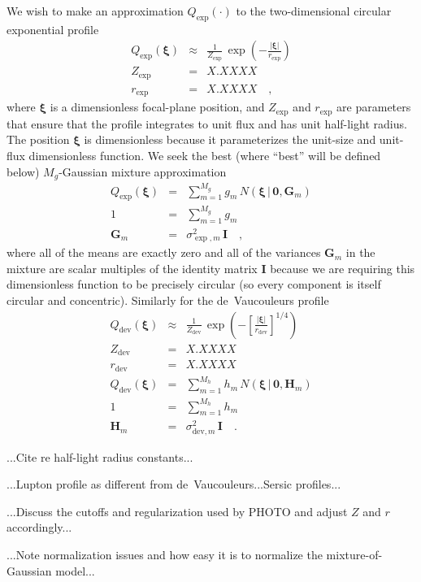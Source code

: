 \documentclass[12pt,pdftex,preprint]{aastex}
\newcommand{\tmatrix}[1]{\boldsymbol{#1}}
\newcommand{\tvector}[1]{\boldsymbol{#1}}
\newcommand{\spos}{\tvector{\xi}}
\newcommand{\Gm}{\tmatrix{G}}
\newcommand{\Hm}{\tmatrix{H}}
\newcommand{\zero}{\tmatrix{0}}
\newcommand{\identity}{\tmatrix{I}}
\newcommand{\normal}{N}
\newcommand{\given}{\,|\,}
\newcommand{\dev}{\mathrm{dev}}
\begin{document}
We wish to make an approximation $Q_{\exp}(\cdot)$ to the
two-dimensional circular exponential profile
\begin{eqnarray}\displaystyle
Q_{\exp}(\spos) &\approx& \frac{1}{Z_{\exp}}\,\exp(-\frac{|\spos|}{r_{\exp}})
\\
Z_{\exp} &=& X.XXXX
\\
r_{\exp} &=& X.XXXX
\quad ,
\end{eqnarray}
where $\spos$ is a dimensionless focal-plane position, and $Z_{\exp}$
and $r_{\exp}$ are parameters that ensure that the profile integrates
to unit flux and has unit half-light radius.  The position $\spos$ is
dimensionless because it parameterizes the unit-size and unit-flux
dimensionless function.  We seek the best (where ``best'' will be
defined below) $M_g$-Gaussian mixture approximation
\begin{eqnarray}\displaystyle
Q_{\exp}(\spos) &=& \sum_{m=1}^{M_g} g_m\,\normal(\spos\given\zero,\Gm_m)
\\
1 &=& \sum_{m=1}^{M_g} g_m
\\
\Gm_m &=& \sigma^2_{\exp,m}\,\identity
\quad ,
\end{eqnarray}
where all of the means are exactly zero and all of the variances
$\Gm_m$ in the mixture are scalar multiples of the identity matrix
$\identity$ because we are requiring this dimensionless function to be
precisely circular (so every component is itself circular and
concentric).  Similarly for the de~Vaucouleurs profile
\begin{eqnarray}\displaystyle
Q_{\dev}(\spos) &\approx& \frac{1}{Z_{\dev}}\,\exp(-\left[\frac{|\spos|}{r_{\dev}}\right]^{1/4})
\\
Z_{\dev} &=& X.XXXX
\\
r_{\dev} &=& X.XXXX
\\
Q_{\dev}(\spos) &=& \sum_{m=1}^{M_h} h_m\,\normal(\spos\given\zero,\Hm_m)
\\
1 &=& \sum_{m=1}^{M_h} h_m
\\
\Hm_m &=& \sigma^2_{\dev,m}\,\identity
\quad .
\end{eqnarray}

...Cite \citep{ciotti} re half-light radius constants...

...Lupton profile as different from de~Vaucouleurs...Sersic profiles...

...Discuss the cutoffs and regularization used by PHOTO and adjust $Z$ and $r$ accordingly...

...Note normalization issues and how easy it is to normalize the mixture-of-Gaussian model...
\end{document}
